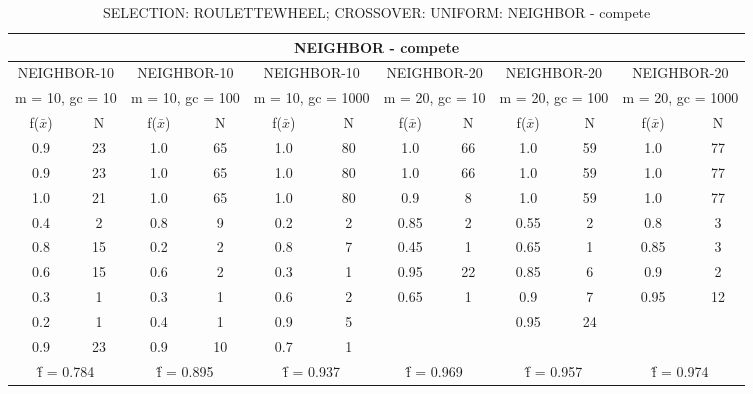 \begin{table}[H]
	\centering
	\caption{SELECTION: ROULETTEWHEEL; CROSSOVER: UNIFORM: NEIGHBOR - compete}
	\begin{adjustbox}{width=1\textwidth}
		\begin{tabular}{ |c|c||c|c||c|c||c|c||c|c||c|c| }
			\hline
			\multicolumn{12}{|c|}{NEIGHBOR - compete} \\
			\hline
			\multicolumn{2}{|c||}{NEIGHBOR-10} & \multicolumn{2}{c||}{NEIGHBOR-10} & \multicolumn{2}{c||}{NEIGHBOR-10} & \multicolumn{2}{c||}{NEIGHBOR-20} & \multicolumn{2}{c||}{NEIGHBOR-20} & \multicolumn{2}{c|}{NEIGHBOR-20}\\
			\hline
			\multicolumn{2}{|c||}{m = 10, gc = 10} & \multicolumn{2}{c||}{m = 10, gc = 100} & \multicolumn{2}{c||}{m = 10, gc = 1000} & \multicolumn{2}{c||}{m = 20, gc = 10} & \multicolumn{2}{c||}{m = 20, gc = 100} & \multicolumn{2}{c|}{m = 20, gc = 1000}\\
			\hline
			f($\bar{x}$) & N & f($\bar{x}$) & N & f($\bar{x}$) & N & f($\bar{x}$) & N & f($\bar{x}$) & N & f($\bar{x}$) & N\\
			\hline
			\hline
			0.9 & 23 & 1.0 & 65 & 1.0 & 80 & 1.0 & 66 & 1.0 & 59 & 1.0 & 77\\
			\hline
			0.9 & 23 & 1.0 & 65 & 1.0 & 80 & 1.0 & 66 & 1.0 & 59 & 1.0 & 77\\
			1.0 & 21 & 1.0 & 65 & 1.0 & 80 & 0.9 & 8 & 1.0 & 59 & 1.0 & 77\\
			0.4 & 2 & 0.8 & 9 & 0.2 & 2 & 0.85 & 2 & 0.55 & 2 & 0.8 & 3\\
			0.8 & 15 & 0.2 & 2 & 0.8 & 7 & 0.45 & 1 & 0.65 & 1 & 0.85 & 3\\
			0.6 & 15 & 0.6 & 2 & 0.3 & 1 & 0.95 & 22 & 0.85 & 6 & 0.9 & 2\\
			0.3 & 1 & 0.3 & 1 & 0.6 & 2 & 0.65 & 1 & 0.9 & 7 & 0.95 & 12\\
			0.2 & 1 & 0.4 & 1 & 0.9 & 5 &   &   & 0.95 & 24 &   &  \\
			0.9 & 23 & 0.9 & 10 & 0.7 & 1 &   &   &   &   &   &  \\
			\hline
			\multicolumn{2}{|c||}{\^{f} = 0.784} & \multicolumn{2}{c||}{\^{f} = 0.895} & \multicolumn{2}{c||}{\^{f} = 0.937} & \multicolumn{2}{c||}{\^{f} = 0.969} & \multicolumn{2}{c||}{\^{f} = 0.957} & \multicolumn{2}{c|}{\^{f} = 0.974}\\
			\hline
		\end{tabular}
	\end{adjustbox}
\end{table}

